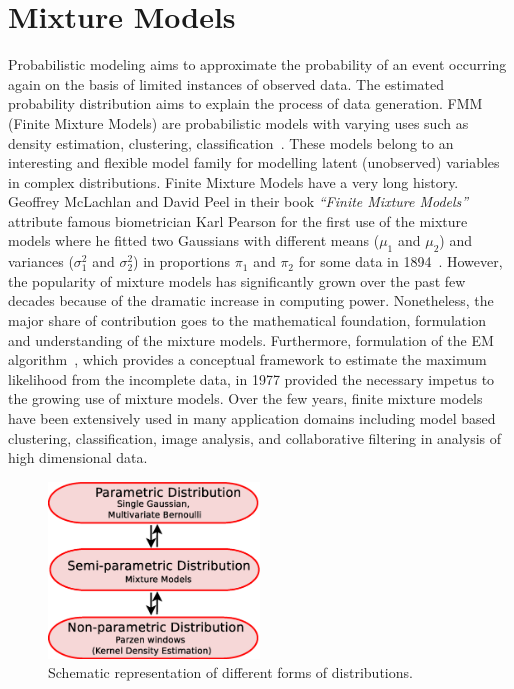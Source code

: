 \section{Mixture Models}
\label{s:mixmodels}
Probabilistic modeling aims to approximate the probability of an event occurring again on the basis of limited instances of observed data. The estimated probability distribution aims to explain the process of data generation. FMM (Finite Mixture Models) are probabilistic models with varying uses such as density estimation, clustering, classification~\cite{bishop, everittmixdist, mclachlanfmm}. These models belong to an interesting and flexible model family for modelling latent (unobserved) variables in complex distributions. Finite Mixture Models have a very long history. Geoffrey McLachlan and David Peel in their book \textit{``Finite Mixture Models''} attribute famous biometrician Karl Pearson for the first use of the mixture models where he fitted two Gaussians with different means ($\mu _1$ and $\mu _2$) and variances ($\sigma _1 ^ 2$ and $\sigma _2 ^ 2$) in proportions $\pi _1 $ and $\pi _2$ for some data in 1894~\cite{mclachlanfmm}. However, the popularity of mixture models has significantly grown over the past few decades because of the dramatic increase in computing power. Nonetheless,  the major share of contribution goes to the mathematical foundation, formulation and understanding of the mixture models. Furthermore, formulation of the EM algorithm~\cite{expectmax}, which provides a conceptual framework to estimate the maximum likelihood from the incomplete data, in 1977 provided the necessary impetus to the growing use of mixture models. Over the few years, finite mixture models have been extensively used in many application domains including model based clustering, classification, image analysis, and collaborative filtering in analysis of high dimensional data. 

\begin{figure}[h!]
\centering
\includegraphics[width=0.5\textwidth]{figures/semipara}
\caption[Different types of distributions]{Schematic representation of different forms of distributions.}\label{Fig:semiparametric}
\end{figure}


